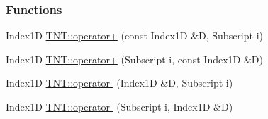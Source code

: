 \subsubsection*{Functions}
\begin{DoxyCompactItemize}
\item 
Index1D \hyperlink{namespace_t_n_t_a51b24ce5ffa283f99de3d7272a5578b5}{TNT::operator+} (const Index1D \&D, Subscript i)
\item 
Index1D \hyperlink{namespace_t_n_t_a5d1dba378abe4e8fbf5764b1b79356cf}{TNT::operator+} (Subscript i, const Index1D \&D)
\item 
Index1D \hyperlink{namespace_t_n_t_ac0c985521e0128a6ee01e282490d7375}{TNT::operator-\/} (Index1D \&D, Subscript i)
\item 
Index1D \hyperlink{namespace_t_n_t_a02c702b71bdddc79a5bfb509a57ae62a}{TNT::operator-\/} (Subscript i, Index1D \&D)
\end{DoxyCompactItemize}
